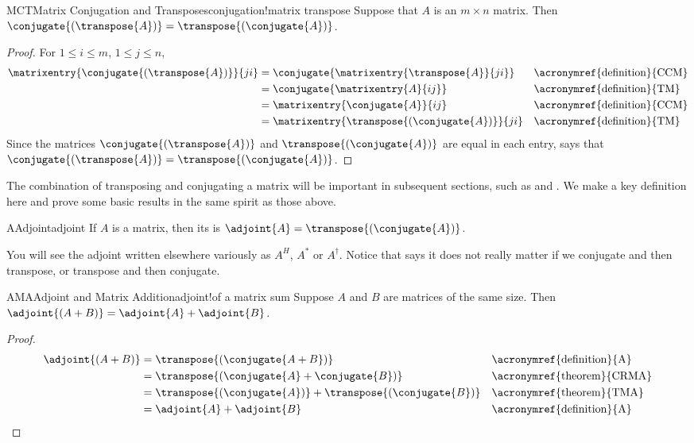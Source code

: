%
\begin{theorem}{MCT}{Matrix Conjugation and Transposes}{conjugation!matrix transpose}
Suppose that $A$ is an $m\times n$ matrix.  Then $\conjugate{\left(\transpose{A}\right)}=\transpose{\left(\conjugate{A}\right)}$.
\end{theorem}
%
\begin{proof}
%
For $1\leq i\leq m$, $1\leq j\leq n$,
%
\begin{align*}
%
\matrixentry{\conjugate{\left(\transpose{A}\right)}}{ji}
%
&=\conjugate{\matrixentry{\transpose{A}}{ji}}
&&\text{\acronymref{definition}{CCM}}\\
%
&=\conjugate{\matrixentry{A}{ij}}
&&\text{\acronymref{definition}{TM}}\\
%
&=\matrixentry{\conjugate{A}}{ij}
&&\text{\acronymref{definition}{CCM}}\\
%
&=\matrixentry{\transpose{\left(\conjugate{A}\right)}}{ji}
&&\text{\acronymref{definition}{TM}}\\
%
\end{align*}
%
Since the matrices  $\conjugate{\left(\transpose{A}\right)}$ and $\transpose{\left(\conjugate{A}\right)}$  are equal in each entry,  says that $\conjugate{\left(\transpose{A}\right)}=\transpose{\left(\conjugate{A}\right)}$.
%
\end{proof}
%
%
The combination of transposing and conjugating a matrix will be important in subsequent sections, such as  and .  We make a key definition here and prove some basic results in the same spirit as those above.
%
\begin{definition}{A}{Adjoint}{adjoint}
If $A$ is a matrix, then its  is
$\adjoint{A}=\transpose{\left(\conjugate{A}\right)}$.
\end{definition}
%
You will see the adjoint written elsewhere variously as $A^H$, $A^\ast$ or $A^\dagger$.  Notice that  says it does not really matter if we conjugate and then transpose, or transpose and then conjugate.
%
\begin{theorem}{AMA}{Adjoint and Matrix Addition}{adjoint!of a matrix sum}
Suppose $A$ and $B$ are matrices of the same size.  Then $\adjoint{\left(A+B\right)}=\adjoint{A}+\adjoint{B}$.
\end{theorem}
%
\begin{proof}
%
\begin{align*}
\adjoint{\left(A+B\right)}
&=\transpose{\left(\conjugate{A+B}\right)}
&&\text{\acronymref{definition}{A}}\\
%
&=\transpose{\left(\conjugate{A}+\conjugate{B}\right)}
&&\text{\acronymref{theorem}{CRMA}}\\
%
&=\transpose{\left(\conjugate{A}\right)}+\transpose{\left(\conjugate{B}\right)}
&&\text{\acronymref{theorem}{TMA}}\\
%
&=\adjoint{A}+\adjoint{B}
&&\text{\acronymref{definition}{A}}
%
\end{align*}
%
\end{proof}
